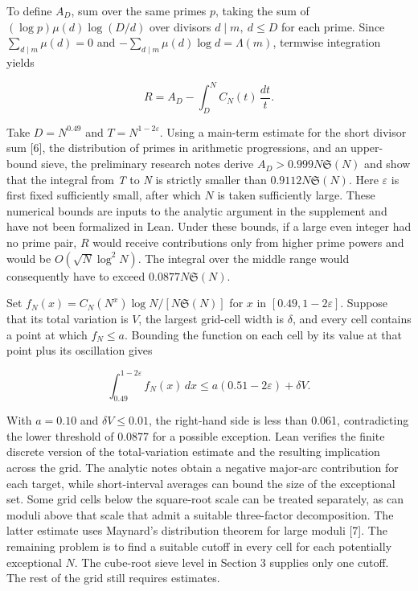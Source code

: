 \documentclass[11pt,a4paper]{article}
\begin{document}
To define $A_D$, sum over the same primes $p$, taking the sum of $(\log p)\mu(d)\log(D/d)$ over divisors $d\mid m,\ d\le D$ for each prime. Since $\sum_{d\mid m}\mu(d)=0$ and $-\sum_{d\mid m}\mu(d)\log d=\Lambda(m)$, termwise integration yields

\[
R=A_D-\int_D^N C_N(t)\,\frac{dt}{t}.
\]

Take $D=N^{0.49}$ and $T=N^{1-2\varepsilon}$. Using a main-term estimate for the short divisor sum [6], the distribution of primes in arithmetic progressions, and an upper-bound sieve, the preliminary research notes derive $A_D>0.999N\mathfrak S(N)$ and show that the integral from \emph{T} to \emph{N} is strictly smaller than $0.9112N\mathfrak S(N)$. Here $\varepsilon$ is first fixed sufficiently small, after which $N$ is taken sufficiently large. These numerical bounds are inputs to the analytic argument in the supplement and have not been formalized in Lean. Under these bounds, if a large even integer had no prime pair, $R$ would receive contributions only from higher prime powers and would be $O(\sqrt N\log^2N)$. The integral over the middle range would consequently have to exceed $0.0877N\mathfrak S(N)$.

Set $f_N(x)=C_N(N^x)\log N/[N\mathfrak S(N)]$ for $x$ in $[0.49,1-2\varepsilon]$. Suppose that its total variation is $V$, the largest grid-cell width is $\delta$, and every cell contains a point at which $f_N\le a$. Bounding the function on each cell by its value at that point plus its oscillation gives

\[
\int_{0.49}^{1-2\varepsilon}f_N(x)\,dx\le a(0.51-2\varepsilon)+\delta V.
\]

With $a=0.10$ and $\delta V\le0.01$, the right-hand side is less than 0.061, contradicting the lower threshold of 0.0877 for a possible exception. Lean verifies the finite discrete version of the total-variation estimate and the resulting implication across the grid. The analytic notes obtain a negative major-arc contribution for each target, while short-interval averages can bound the size of the exceptional set. Some grid cells below the square-root scale can be treated separately, as can moduli above that scale that admit a suitable three-factor decomposition. The latter estimate uses Maynard's distribution theorem for large moduli [7]. The remaining problem is to find a suitable cutoff in every cell for each potentially exceptional $N$. The cube-root sieve level in Section 3 supplies only one cutoff. The rest of the grid still requires estimates.
\end{document}
